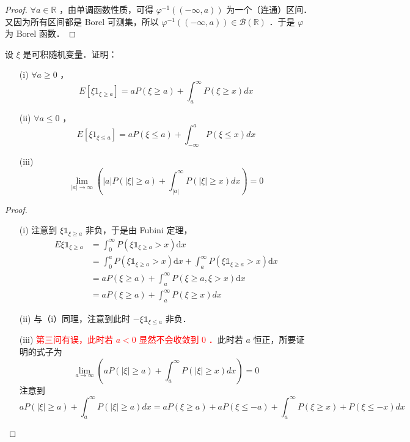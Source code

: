 \begin{proof}
    $\forall a \in \mathbb{R}$ ，由单调函数性质，可得 $\varphi^{-1}((-\infty, a))$ 为一个（连通）区间．又因为所有区间都是 Borel 可测集，所以 $\varphi^{-1}((-\infty, a)) \in \mathscr{B}(\mathbb{R})$ ．于是 $\varphi$ 为 Borel 函数．
\end{proof}
\begin{exercise}
    设 $\xi$ 是可积随机变量．证明：
    \begin{enumerate}
        \item[(i)] $\forall a \geqslant 0$ ，
            $$
                E\left[\xi 1_{\xi \geqslant a}\right]=a P(\xi \geqslant a)+\int_a^{\infty} P(\xi \geqslant x) d x
            $$
        \item[(ii)] $\forall a \leqslant 0$ ，
            $$
                E\left[\xi 1_{\xi \leq a}\right]=a P(\xi \leqslant a)+\int_{-\infty}^a P(\xi \leqslant x) d x
            $$
        \item[(iii)]
            $$
                \lim _{|a| \rightarrow \infty}\left(|a| P(|\xi| \geqslant a)+\int_{|a|}^{\infty} P(|\xi| \geqslant x) d x\right)=0
            $$
    \end{enumerate}
\end{exercise}
\begin{proof}
    \begin{enumerate}
        \item[(i)] 注意到 $\xi \mathbb{1}_{\xi \geq a}$ 非负，于是由 Fubini 定理，
            $$
                \begin{aligned}
                    E \xi \mathbb{1}_{\xi \geq a} & =\int_0^{\infty} P\left(\xi \mathbb{1}_{\xi \geq a}>x\right) \mathrm{d} x                                                                   \\
                                                  & =\int_0^a P\left(\xi \mathbb{1}_{\xi \geq a}>x\right) \mathrm{d} x+\int_a^{\infty} P\left(\xi \mathbb{1}_{\xi \geq a}>x\right) \mathrm{d} x \\
                                                  & =a P(\xi \geq a)+\int_a^{\infty} P(\xi \geq a, \xi>x) \mathrm{d} x                                                                          \\
                                                  & =a P(\xi \geqslant a)+\int_a^{\infty} P(\xi \geqslant x) d x
                \end{aligned}
            $$
        \item[(ii)] 与（i）同理，注意到此时 $-\xi \mathbb{1}_{\xi \leq a}$ 非负．
        \item[(iii)] \textcolor{red}{第三问有误，此时若 $a<0$ 显然不会收敛到 0 ．}此时若 $a$ 恒正，所要证明的式子为
            $$
                \lim _{a \rightarrow \infty}\left(a P(|\xi| \geqslant a)+\int_a^{\infty} P(|\xi| \geqslant x) d x\right)=0
            $$
            注意到
            $$
                a P(|\xi| \geqslant a)+\int_a^{\infty} P(|\xi| \geqslant a) d x=a P(\xi \geq a)+a P(\xi \leq-a)+\int_a^{\infty} P(\xi \geq x)+P(\xi \leq-x) d x
            $$
    \end{enumerate}
\end{proof}
